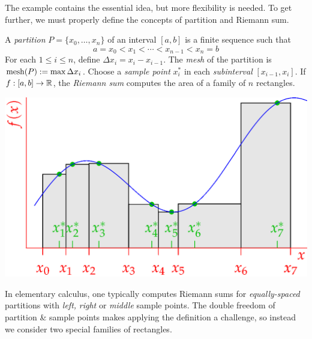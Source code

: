 The example contains the essential idea, but more flexibility is needed. To get further, we must properly define the concepts of partition and Riemann sum.


\goodbreak

\begin{defn}{}{}
A \emph{partition} $P=\{x_0,\ldots,x_n\}$ of an interval $[a,b]$ is a finite sequence such that
\[a=x_0<x_1<\cdots< x_{n-1}< x_n=b\]
For each $1\le i\le n$, define $\Delta x_i=x_i-x_{i-1}$. The \emph{mesh} of the partition is $\operatorname{mesh}(P):=\max\Delta x_i$.\smallbreak
Choose a \emph{sample point} $x_i^*$ in each \emph{subinterval} $[x_{i-1},x_i]$.\smallbreak
If $f:[a,b]\to\mathbb{R}$, the \emph{Riemann sum}  computes the area of a family of $n$ rectangles. 
\begin{center}
\includegraphics{riemann-sum}
\end{center}
\end{defn}

In elementary calculus, one typically computes Riemann sums for \emph{equally-spaced} partitions with \emph{left,} \emph{right} or \emph{middle} sample points. The double freedom of partition \& sample points makes applying the definition a challenge, so instead we consider two special families of rectangles. 


